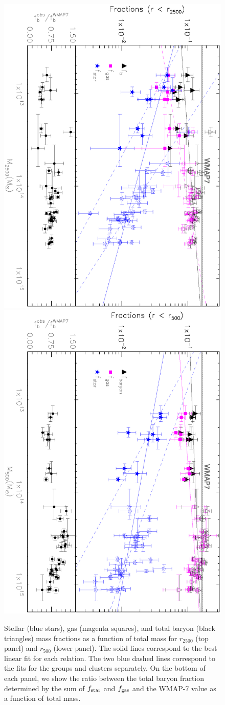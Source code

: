 \documentclass{aa}
\begin{document}
\begin{figure}[ht]
\centering
\includegraphics[angle=90,width=9.cm]{Fracs2500+erros_gruposM12_fitsep_Novo.ps}\\
\includegraphics[angle=90,width=9.cm]{Fracs+erros_gruposM12_fitsep_Novo.ps}
\caption{Stellar (blue stars), gas (magenta squares), and total baryon (black triangles) mass fractions as a function
of total mass for $r_{2500}$ (top panel) and $r_{500}$ (lower panel). The solid lines correspond to the best linear fit for each
relation. The two blue dashed lines correspond to the fits for the groups and clusters separately.
On the bottom of each panel, we show the ratio between the total baryon fraction determined by the 
sum of $f_{\rm star}$ and $f_{\rm gas}$ and the WMAP-7 value as a function of total mass.}
\label{fig:fracs}
\end{figure}
\end{document}
